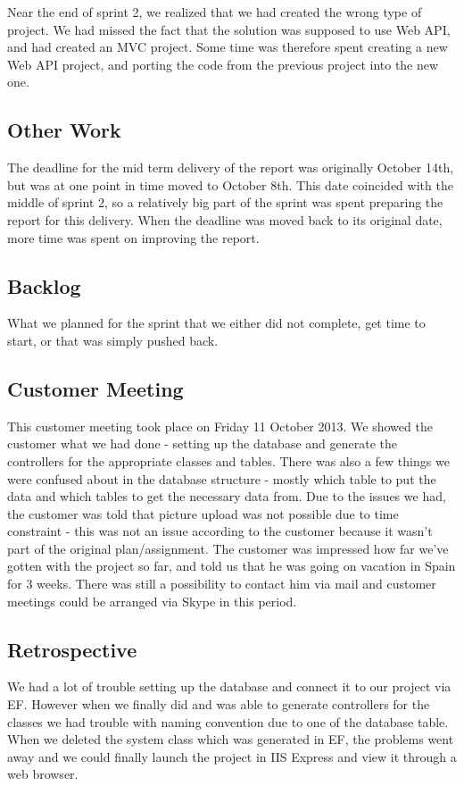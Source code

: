 Near the end of sprint 2, we realized that we had created the wrong type of project. We had missed the fact that the solution was supposed to use Web API, and had created an MVC project. Some time was therefore spent creating a new Web API project, and porting the code from the previous project into the new one.

\subsection{Other Work}
The deadline for the mid term delivery of the report was originally October 14th, but was at one point in time moved to October 8th. This date coincided with the middle of sprint 2, so a relatively big part of the sprint was spent preparing the report for this delivery. When the deadline was moved back to its original date, more time was spent on improving the report.

\subsection{Backlog}
What we planned for the sprint that we either did not complete, get time to start, or that was simply pushed back.

\subsection{Customer Meeting}
This customer meeting took place on Friday 11 October 2013. We showed the customer what we had done - setting up the database and generate the controllers for the appropriate classes and tables. There was also a few things we were confused about in the database structure - mostly which table to put the data and which tables to get the necessary data from.
Due to the issues we had, the customer was told that picture upload was not possible due to time constraint - this was not an issue according to the customer because it wasn't part of the original plan/assignment.
The customer was impressed how far we've gotten with the project so far, and told us that he was going on vacation in Spain for 3 weeks. There was still a possibility to contact him via mail and customer meetings could be arranged via Skype in this period. 


\subsection{Retrospective}
We had a lot of trouble setting up the database and connect it to our project via EF. However when we finally did and was able to generate controllers for the classes we had trouble with naming convention due to one of the database table. When we deleted the system class which was generated in EF, the problems went away and we could finally launch the project in IIS Express and view it through a web browser. %